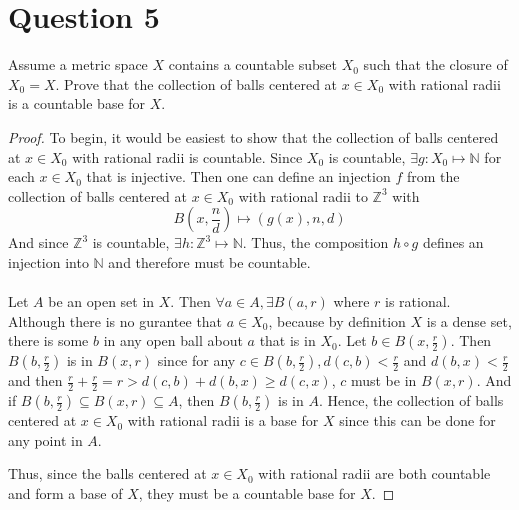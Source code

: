 \documentclass[12pt, letterpaper]{article}
\begin{document}
\section*{Question 5}
Assume a metric space $X$ contains a countable subset $X_0$ such that the closure of $X_0 = X$. Prove that the collection of balls centered at $x \in X_0$ with rational radii is a countable base for $X$.
\begin{proof}
  To begin, it would be easiest to show that the collection of balls centered at $x \in X_0$ with rational radii is countable. Since $X_0$ is countable, $\exists g: X_0 \mapsto \mathbb{N}$ for each $x \in X_0$ that is injective.
  Then one can define an injection $f$ from the collection of balls centered at $x \in X_0$ with rational radii to $\mathbb{Z}^3$ with
  $$ B(x, \frac{n}{d}) \mapsto (g(x), n, d)$$
  And since $\mathbb{Z}^3$ is countable, $\exists h: \mathbb{Z}^3 \mapsto \mathbb{N}$. Thus, the composition $h \circ g$ defines an injection into $\mathbb{N}$
  and therefore must be countable.\\
  \\
  Let $A$ be an open set in $X$. Then $\forall a\in A, \exists B(a, r)$ where $r$ is rational. Although there is no gurantee that $a \in X_0$, because by definition $X$ is a dense set,
  there is some $b$ in any open ball about $a$ that is in $X_0$. Let $b \in B(x, \frac{r}{2})$. Then $B(b, \frac{r}{2})$ is in $B(x, r)$ since for any $c \in B(b, \frac{r}{2}), d(c, b) < \frac{r}{2}$
  and $d(b, x) < \frac{r}{2}$ and then $\frac{r}{2} + \frac{r}{2} = r > d(c, b) + d(b, x) \geq d(c, x) $, $c$ must be in $B(x, r)$. And if $B(b, \frac{r}{2}) \subseteq B(x, r) \subseteq A$, then $B(b, \frac{r}{2})$ is in $A$.
  Hence, the collection of balls centered at $x \in X_0$ with rational radii is a base for $X$ since this can be done for any point in $A$.

  Thus, since the balls centered at $x \in X_0$ with rational radii are both countable and form a base of $X$, they must be a countable base for $X$.
\end{proof}
\end{document}
